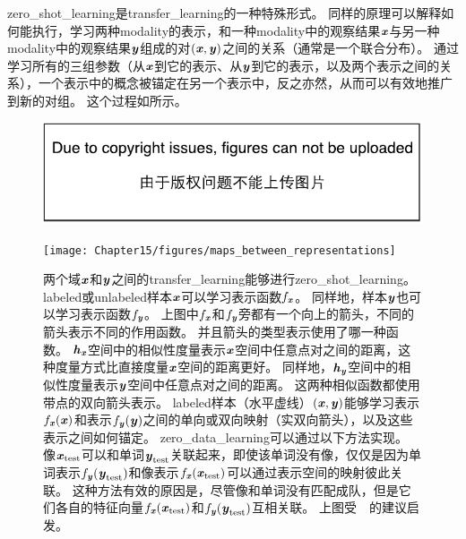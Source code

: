 
\gls{zero_shot_learning}是\gls{transfer_learning}的一种特殊形式。
同样的原理可以解释如何能执行，学习两种\gls{modality}的表示，和一种\gls{modality}中的观察结果$\Vx$与另一种\gls{modality}中的观察结果$\Vy$组成的对$(\Vx, \Vy)$之间的关系（通常是一个联合分布）\citep{Srivastava+Salakhutdinov-NIPS2012-small}。
通过学习所有的三组参数（从$\Vx$到它的表示、从$\Vy$到它的表示，以及两个表示之间的关系），一个表示中的概念被锚定在另一个表示中，反之亦然，从而可以有效地推广到新的对组。 %
这个过程如所示。



\begin{figure}[!htb]
\ifOpenSource
\centerline{\includegraphics{figure.pdf}}
\else
\centerline{\texttt{[image: Chapter15/figures/maps\_between\_representations]}}
\fi
\caption{两个域$\Vx$和$\Vy$之间的\gls{transfer_learning}能够进行\gls{zero_shot_learning}。
\gls{labeled}或\gls{unlabeled}样本$\Vx$可以学习表示函数$f_{\Vx}$。
同样地，样本$\Vy$也可以学习表示函数$f_{\Vy}$。
上图中$f_{\Vx}$和$f_{\Vy}$旁都有一个向上的箭头，不同的箭头表示不同的作用函数。
并且箭头的类型表示使用了哪一种函数。
$\Vh_{\Vx}$空间中的相似性度量表示$\Vx$空间中任意点对之间的距离，这种度量方式比直接度量$\Vx$空间的距离更好。
同样地，$\Vh_{\Vy}$空间中的相似性度量表示$\Vy$空间中任意点对之间的距离。
这两种相似函数都使用带点的双向箭头表示。
\gls{labeled}样本（水平虚线）$(\Vx, \Vy)$能够学习表示$f_{\Vx}(\Vx)$和表示$f_{\Vy}(\Vy)$之间的单向或双向映射（实双向箭头），以及这些表示之间如何锚定。
\gls{zero_data_learning}可以通过以下方法实现。
像$\Vx_{\text{test}}$可以和单词$\Vy_{\text{test}}$关联起来，即使该单词没有像，仅仅是因为单词表示$f_{\Vy}(\Vy_{\text{test}})$和像表示$f_{\Vx}(\Vx_{\text{test}})$可以通过表示空间的映射彼此关联。
这种方法有效的原因是，尽管像和单词没有匹配成队，但是它们各自的特征向量$f_{\Vx}(\Vx_{\text{test}})$和$f_{\Vy}(\Vy_{\text{test}})$互相关联。
上图受~~的建议启发。
}
\label{fig:chap15_maps_between_representations}
\end{figure}

